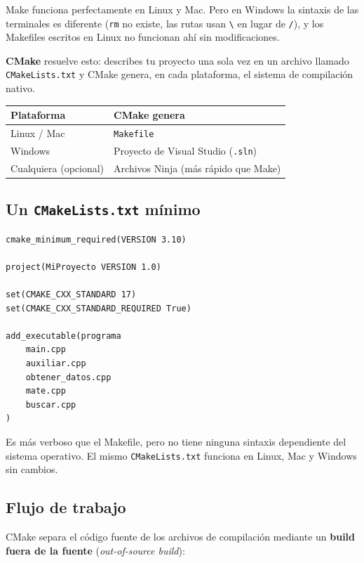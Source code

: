 \documentclass[12pt, oneside]{article}
\begin{document}
Make funciona perfectamente en Linux y Mac.  Pero en Windows la sintaxis
de las terminales es diferente (\texttt{rm} no existe, las rutas usan
\texttt{\textbackslash} en lugar de \texttt{/}), y los Makefiles escritos
en Linux no funcionan ahí sin modificaciones.

\textbf{CMake} resuelve esto: describes tu proyecto una sola vez en un
archivo llamado \texttt{CMakeLists.txt} y CMake genera, en cada
plataforma, el sistema de compilación nativo.

\begin{center}
\begin{tabular}{ll}
  \toprule
  \textbf{Plataforma} & \textbf{CMake genera} \\
  \midrule
  Linux / Mac        & \texttt{Makefile} \\
  Windows            & Proyecto de Visual Studio (\texttt{.sln}) \\
  Cualquiera (opcional) & Archivos Ninja (más rápido que Make) \\
  \bottomrule
\end{tabular}
\end{center}

\subsection{Un \texttt{CMakeLists.txt} mínimo}

\begin{verbatim}
cmake_minimum_required(VERSION 3.10)

project(MiProyecto VERSION 1.0)

set(CMAKE_CXX_STANDARD 17)
set(CMAKE_CXX_STANDARD_REQUIRED True)

add_executable(programa
    main.cpp
    auxiliar.cpp
    obtener_datos.cpp
    mate.cpp
    buscar.cpp
)
\end{verbatim}

Es más verboso que el Makefile, pero no tiene ninguna sintaxis
dependiente del sistema operativo.  El mismo \texttt{CMakeLists.txt}
funciona en Linux, Mac y Windows sin cambios.

\subsection{Flujo de trabajo}

CMake separa el código fuente de los archivos de compilación mediante
un \textbf{build fuera de la fuente} (\textit{out-of-source build}):
\end{document}

